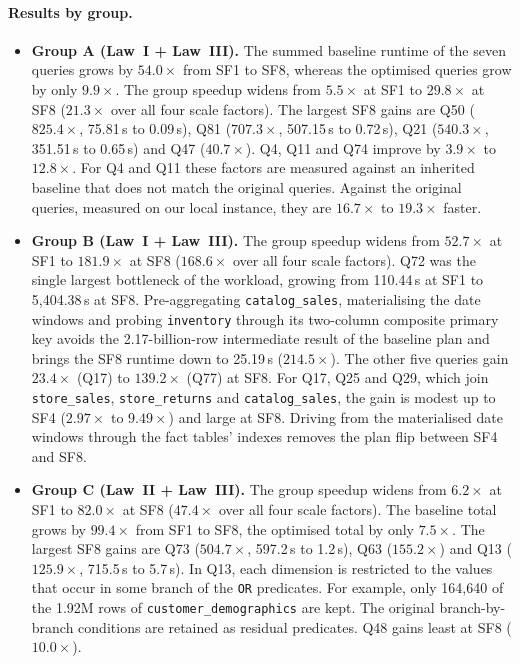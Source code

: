 \documentclass{ULBreport}
\begin{document}
\paragraph{Results by group.}
\begin{itemize}
    \item \textbf{Group A (Law~I + Law~III).} The summed baseline runtime of the seven queries grows by $54.0\times$ from SF1 to SF8, whereas the optimised queries grow by only $9.9\times$. The group speedup widens from $5.5\times$ at SF1 to $29.8\times$ at SF8 ($21.3\times$ over all four scale factors). The largest SF8 gains are Q50 ($825.4\times$, 75.81\,s to 0.09\,s), Q81 ($707.3\times$, 507.15\,s to 0.72\,s), Q21 ($540.3\times$, 351.51\,s to 0.65\,s) and Q47 ($40.7\times$). Q4, Q11 and Q74 improve by $3.9\times$ to $12.8\times$. For Q4 and Q11 these factors are measured against an inherited baseline that does not match the original queries. Against the original queries, measured on our local instance, they are $16.7\times$ to $19.3\times$ faster.
    \item \textbf{Group B (Law~I + Law~III).} The group speedup widens from $52.7\times$ at SF1 to $181.9\times$ at SF8 ($168.6\times$ over all four scale factors). Q72 was the single largest bottleneck of the workload, growing from 110.44\,s at SF1 to 5,404.38\,s at SF8. Pre-aggregating \texttt{catalog\_sales}, materialising the date windows and probing \texttt{inventory} through its two-column composite primary key avoids the 2.17-billion-row intermediate result of the baseline plan and brings the SF8 runtime down to 25.19\,s ($214.5\times$). The other five queries gain $23.4\times$ (Q17) to $139.2\times$ (Q77) at SF8. For Q17, Q25 and Q29, which join \texttt{store\_sales}, \texttt{store\_returns} and \texttt{catalog\_sales}, the gain is modest up to SF4 ($2.97\times$ to $9.49\times$) and large at SF8. Driving from the materialised date windows through the fact tables' indexes removes the plan flip between SF4 and SF8.
    \item \textbf{Group C (Law~II + Law~III).} The group speedup widens from $6.2\times$ at SF1 to $82.0\times$ at SF8 ($47.4\times$ over all four scale factors). The baseline total grows by $99.4\times$ from SF1 to SF8, the optimised total by only $7.5\times$. The largest SF8 gains are Q73 ($504.7\times$, 597.2\,s to 1.2\,s), Q63 ($155.2\times$) and Q13 ($125.9\times$, 715.5\,s to 5.7\,s). In Q13, each dimension is restricted to the values that occur in some branch of the \texttt{OR} predicates. For example, only 164,640 of the 1.92M rows of \texttt{customer\_demographics} are kept. The original branch-by-branch conditions are retained as residual predicates. Q48 gains least at SF8 ($10.0\times$).
\end{itemize}
\end{document}

